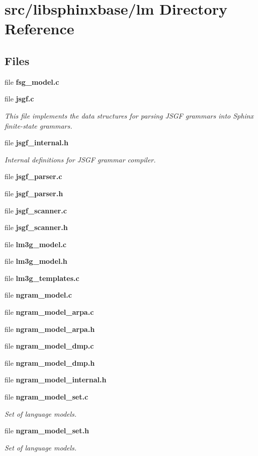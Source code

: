 \section{src/libsphinxbase/lm Directory Reference}
\label{dir_60aae0458aa1ecc8feb93296b73d98ea}
\subsection*{Files}
\begin{DoxyCompactItemize}
\item 
file {\bfseries fsg\-\_\-model.\-c}
\item 
file {\bf jsgf.\-c}
\begin{DoxyCompactList}\small\item\em This file implements the data structures for parsing J\-S\-G\-F grammars into Sphinx finite-\/state grammars. \end{DoxyCompactList}\item 
file {\bf jsgf\-\_\-internal.\-h}
\begin{DoxyCompactList}\small\item\em Internal definitions for J\-S\-G\-F grammar compiler. \end{DoxyCompactList}\item 
file {\bfseries jsgf\-\_\-parser.\-c}
\item 
file {\bfseries jsgf\-\_\-parser.\-h}
\item 
file {\bfseries jsgf\-\_\-scanner.\-c}
\item 
file {\bfseries jsgf\-\_\-scanner.\-h}
\item 
file {\bfseries lm3g\-\_\-model.\-c}
\item 
file {\bfseries lm3g\-\_\-model.\-h}
\item 
file {\bfseries lm3g\-\_\-templates.\-c}
\item 
file {\bfseries ngram\-\_\-model.\-c}
\item 
file {\bfseries ngram\-\_\-model\-\_\-arpa.\-c}
\item 
file {\bfseries ngram\-\_\-model\-\_\-arpa.\-h}
\item 
file {\bfseries ngram\-\_\-model\-\_\-dmp.\-c}
\item 
file {\bfseries ngram\-\_\-model\-\_\-dmp.\-h}
\item 
file {\bfseries ngram\-\_\-model\-\_\-internal.\-h}
\item 
file {\bf ngram\-\_\-model\-\_\-set.\-c}
\begin{DoxyCompactList}\small\item\em Set of language models. \end{DoxyCompactList}\item 
file {\bf ngram\-\_\-model\-\_\-set.\-h}
\begin{DoxyCompactList}\small\item\em Set of language models. \end{DoxyCompactList}\end{DoxyCompactItemize}
